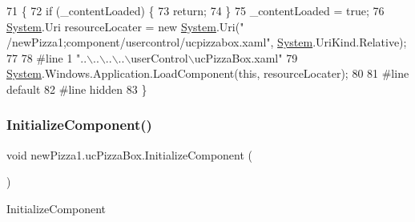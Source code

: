 \begin{DoxyCode}
71                                           \{
72             \textcolor{keywordflow}{if} (\_contentLoaded) \{
73                 \textcolor{keywordflow}{return};
74             \}
75             \_contentLoaded = \textcolor{keyword}{true};
76             \hyperlink{namespaceSystem}{System}.Uri resourceLocater = \textcolor{keyword}{new} \hyperlink{namespaceSystem}{System}.Uri(\textcolor{stringliteral}{"
      /newPizza1;component/usercontrol/ucpizzabox.xaml"}, \hyperlink{namespaceSystem}{System}.UriKind.Relative);
77             
78 \textcolor{preprocessor}{            #line 1 "..\(\backslash\)..\(\backslash\)..\(\backslash\)..\(\backslash\)userControl\(\backslash\)ucPizzaBox.xaml"
}
79             \hyperlink{namespaceSystem}{System}.Windows.Application.LoadComponent(\textcolor{keyword}{this}, resourceLocater);
80             
81 \textcolor{preprocessor}{            #line default
}
82 \textcolor{preprocessor}{            #line hidden
}
83         \}
\end{DoxyCode}
\mbox{\label{classnewPizza1_1_1ucPizzaBox_a0bf3486ff05489987fc9b6766aec72d1}} 
\subsubsection{\texorpdfstring{Initialize\+Component()}{InitializeComponent()}\hspace{0.1cm}{\footnotesize\ttfamily [3/6]}}
{\footnotesize\ttfamily void new\+Pizza1.\+uc\+Pizza\+Box.\+Initialize\+Component (\begin{DoxyParamCaption}{ }\end{DoxyParamCaption})\hspace{0.3cm}{\ttfamily [inline]}}



Initialize\+Component 


